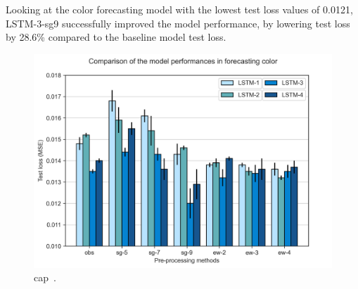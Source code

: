 Looking at the color forecasting model with the lowest test loss values of 0.0121, LSTM-3-sg9 successfully improved the model performance, by lowering test loss by 28.6\% compared to the baseline model test loss.

\begin{figure}[t]
    \centering
    \includegraphics[width=0.7\columnwidth]{imgs/results/feature-engineering/colour-input-1-4-comparison.png}
    \caption{cap~.}
    \label{fig:colour-feature-engineering}
 \end{figure}

